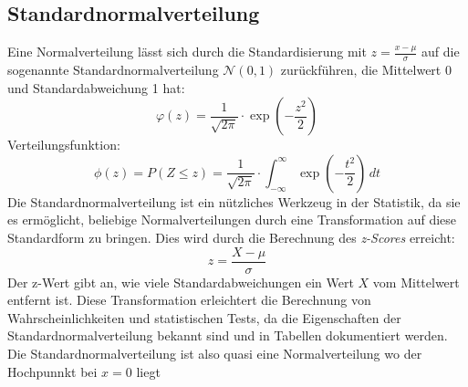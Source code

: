 \subsection{Standardnormalverteilung}
\label{sec:standard_normal_distribution}

Eine Normalverteilung lässt sich durch die Standardisierung mit $z = \frac{x - \mu}{\sigma}$ auf die sogenannte Standardnormalverteilung $\mathcal{N}(0, 1)$ zurückführen, die Mittelwert 0 und Standardabweichung 1 hat:
\[
\varphi(z) = \frac{1}{\sqrt{2 \pi}} \cdot \exp\left(-\frac{z^2}{2}\right)
\]
Verteilungsfunktion:
\[
\phi(z) = P(Z \leq z) = \frac{1}{\sqrt{2 \pi}} \cdot \int_{-\infty}^{\infty} \exp\left(-\frac{t^2}{2}\right)\, dt
\]
Die Standardnormalverteilung ist ein nützliches Werkzeug in der Statistik, da sie es ermöglicht, beliebige Normalverteilungen durch eine Transformation auf diese Standardform zu bringen. Dies wird durch die Berechnung des \textit{z-Scores} erreicht:
\[
z = \frac{X - \mu}{\sigma}
\]
Der z-Wert gibt an, wie viele Standardabweichungen ein Wert \(X\) vom Mittelwert entfernt ist. Diese Transformation erleichtert die Berechnung von Wahrscheinlichkeiten und statistischen Tests, da die Eigenschaften der Standardnormalverteilung bekannt sind und in Tabellen dokumentiert werden.
Die Standardnormalverteilung ist also quasi eine Normalverteilung wo der Hochpunnkt bei $x=0$ liegt

